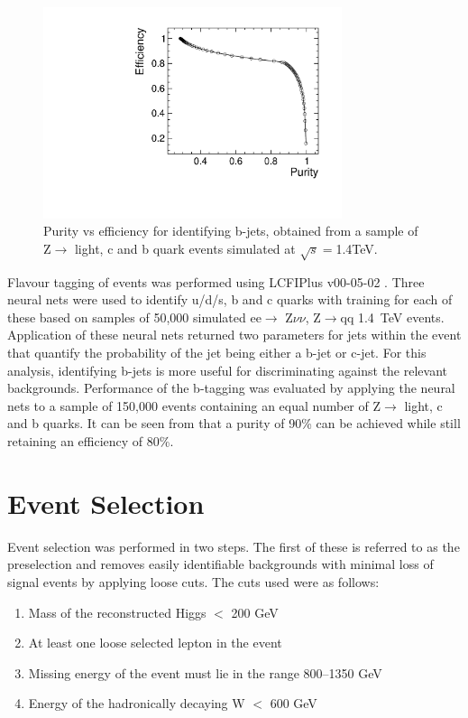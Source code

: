 \begin{figure}
  \centering
  \includegraphics[width=0.78\textwidth,keepaspectratio]{HiggsAnalysis/figures/updatedpurityvsefficiency.pdf}
  \caption[B-Tagging Purity vs Efficiency]{Purity vs efficiency for identifying b-jets, obtained from a sample of Z$\rightarrow$ light, c and b quark events simulated at $\sqrt{s}=$1.4TeV.}
  \label{btag}
\end{figure}

Flavour tagging of events was performed using LCFIPlus v00-05-02 \cite{Suehara:2015ura}. Three neural nets were used to identify u/d/s, b and c quarks with training for each of these based on samples of 50,000 simulated ee$\rightarrow$ Z$\nu\nu$, Z$\rightarrow$qq 1.4~TeV events. Application of these neural nets returned two parameters for jets within the event that quantify the probability of the jet being either a b-jet or c-jet. For this analysis, identifying b-jets is more useful for discriminating against the relevant backgrounds. Performance of the b-tagging was evaluated by applying the neural nets to a sample of 150,000 events containing an equal number of Z$\rightarrow$ light, c and b quarks. It can be seen from  that a purity of 90\% can be achieved while still retaining an efficiency of 80\%.

\section{Event Selection}

Event selection was performed in two steps. The first of these is referred to as the preselection and removes easily identifiable backgrounds with minimal loss of signal events by applying loose cuts. The cuts used were as follows:

\begin{enumerate}

\item Mass of the reconstructed Higgs $<$ 200 GeV
\item At least one loose selected lepton in the event
\item Missing energy of the event must lie in the range 800--1350 GeV
\item Energy of the hadronically decaying W $<$ 600 GeV

\end{enumerate}


